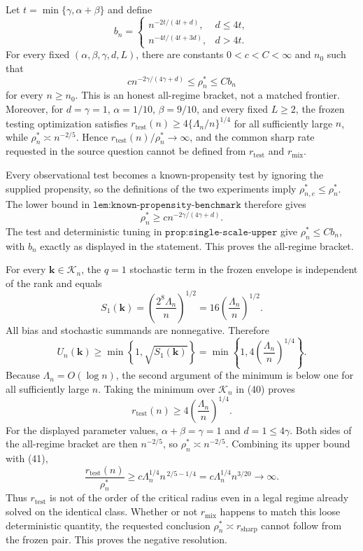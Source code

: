 Let \(t=\min\{\gamma,\alpha+\beta\}\) and define
\[
 b_n=\begin{cases}
 n^{-2t/(4t+d)},&d\le4t,\\
 n^{-4t/(4t+3d)},&d>4t.
 \end{cases}
\]
For every fixed \((\alpha,\beta,\gamma,d,L)\), there are constants \(0<c<C<\infty\) and \(n_0\) such that
\[
 c n^{-2\gamma/(4\gamma+d)}\le\rho_n^*\le Cb_n
\]
for every \(n\ge n_0\). This is an honest all-regime bracket, not a matched frontier. Moreover, for \(d=\gamma=1\), \(\alpha=1/10\), \(\beta=9/10\), and every fixed \(L\ge2\), the frozen testing optimization satisfies \(r_{\mathrm{test}}(n)\ge4\{\Lambda_n/n\}^{1/4}\) for all sufficiently large \(n\), while \(\rho_n^*\asymp n^{-2/5}\). Hence \(r_{\mathrm{test}}(n)/\rho_n^*\to\infty\), and the common sharp rate requested in the source question cannot be defined from \(r_{\mathrm{test}}\) and \(r_{\mathrm{mix}}\).

Every observational test becomes a known-propensity test by ignoring the supplied propensity, so the definitions of the two experiments imply \(\rho_{n,e}^*\le\rho_n^*\). The lower bound in \(\texttt{lem:known-propensity-benchmark}\) therefore gives
\[
 \rho_n^*\ge c n^{-2\gamma/(4\gamma+d)}.                              \tag{38}
\]
The test and deterministic tuning in \(\texttt{prop:single-scale-upper}\) give \(\rho_n^*\le Cb_n\), with \(b_n\) exactly as displayed in the statement. This proves the all-regime bracket.

For every \(\mathbf k\in\mathcal K_n\), the \(q=1\) stochastic term in the frozen envelope is independent of the rank and equals
\[
 S_1(\mathbf k)
 =\left(\frac{2^8\Lambda_n}{n}\right)^{1/2}
 =16\left(\frac{\Lambda_n}{n}\right)^{1/2}.                          \tag{39}
\]
All bias and stochastic summands are nonnegative. Therefore
\[
 U_n(\mathbf k)
 \ge\min\left\{1,\sqrt{S_1(\mathbf k)}\right\}
 =\min\left\{1,4\left(\frac{\Lambda_n}{n}\right)^{1/4}\right\}.       \tag{40}
\]
Because \(\Lambda_n=O(\log n)\), the second argument of the minimum is below one for all sufficiently large \(n\). Taking the minimum over \(\mathcal K_n\) in (40) proves
\[
 r_{\mathrm{test}}(n)\ge4\left(\frac{\Lambda_n}{n}\right)^{1/4}.     \tag{41}
\]
For the displayed parameter values, \(\alpha+\beta=\gamma=1\) and \(d=1\le4\gamma\). Both sides of the all-regime bracket are then \(n^{-2/5}\), so \(\rho_n^*\asymp n^{-2/5}\). Combining its upper bound with (41),
\[
 \frac{r_{\mathrm{test}}(n)}{\rho_n^*}
 \ge c\Lambda_n^{1/4}n^{\,2/5-1/4}
 =c\Lambda_n^{1/4}n^{3/20}\longrightarrow\infty.                    \tag{42}
\]
Thus \(r_{\mathrm{test}}\) is not of the order of the critical radius even in a legal regime already solved on the identical class. Whether or not \(r_{\mathrm{mix}}\) happens to match this loose deterministic quantity, the requested conclusion \(\rho_n^*\asymp r_{\mathrm{sharp}}\) cannot follow from the frozen pair. This proves the negative resolution.

